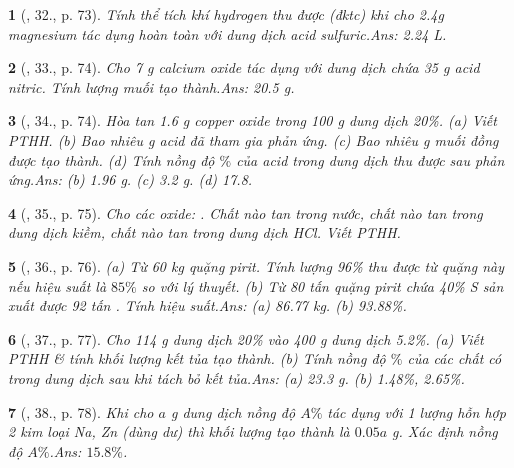 \documentclass{article}
\newtheorem{baitoan}{}
\begin{document}
\begin{baitoan}[\cite{An_Hoa_Hoc_nang_cao_8_9}, 32., p. 73]
	Tính thể tích khí hydrogen thu được (đktc) khi cho {\rm2.4g} magnesium tác dụng hoàn toàn với dung dịch acid sulfuric.\hfill{\sf Ans: 2.24 L.}
\end{baitoan}

\begin{baitoan}[\cite{An_Hoa_Hoc_nang_cao_8_9}, 33., p. 74]
	Cho {\rm7 g} calcium oxide tác dụng với dung dịch chứa {\rm35 g} acid nitric. Tính lượng muối tạo thành.\hfill{\sf Ans: 20.5 g.}
\end{baitoan}

\begin{baitoan}[\cite{An_Hoa_Hoc_nang_cao_8_9}, 34., p. 74]
	Hòa tan {\rm1.6 g} copper oxide trong {\rm100 g} dung dịch {\rm{} 20\%}. (a) Viết {\rm PTHH}. (b) Bao nhiêu {\rm g} acid đã tham gia phản ứng. (c) Bao nhiêu {\rm g} muối đồng được tạo thành. (d) Tính nồng độ $\%$ của acid trong dung dịch thu được sau phản ứng.\hfill{\sf Ans: (b) 1.96 g. (c) 3.2 g. (d) 17.8.}
\end{baitoan}

\begin{baitoan}[\cite{An_Hoa_Hoc_nang_cao_8_9}, 35., p. 75]
	Cho các oxide: {\rm{}}. Chất nào tan trong nước, chất nào tan trong dung dịch kiềm, chất nào tan trong dung dịch {\rm HCl}. Viết {\rm PTHH}.
\end{baitoan}

\begin{baitoan}[\cite{An_Hoa_Hoc_nang_cao_8_9}, 36., p. 76]
	(a) Từ {\rm60 kg} quặng pirit. Tính lượng {\rm{} 96\%} thu được từ quặng này nếu hiệu suất là $85\%$ so với lý thuyết. (b) Từ {\rm80} tấn quặng pirit chứa {\rm40\% S} sản xuất được {\rm92} tấn {\rm{}}. Tính hiệu suất.\hfill{\sf Ans: (a) 86.77 kg. (b) 93.88\%.}
\end{baitoan}

\begin{baitoan}[\cite{An_Hoa_Hoc_nang_cao_8_9}, 37., p. 77]
	Cho {\rm114 g} dung dịch {\rm{} 20\%} vào {\rm400 g} dung dịch {\rm{} 5.2\%}. (a) Viết {\rm PTHH} \& tính khối lượng kết tủa tạo thành. (b) Tính nồng độ $\%$ của các chất có trong dung dịch sau khi tách bỏ kết tủa.\hfill{\sf Ans: (a) 23.3 g. (b) 1.48\%, 2.65\%.}
\end{baitoan}

\begin{baitoan}[\cite{An_Hoa_Hoc_nang_cao_8_9}, 38., p. 78]
	Khi cho $a$ {\rm g} dung dịch {\rm {}} nồng độ $A\%$ tác dụng với 1 lượng hỗn hợp 2 kim loại {\rm Na, Zn} (dùng dư) thì khối lượng {\rm {}} tạo thành là $0.05a$ {\rm g}. Xác định nồng độ $A\%$.\hfill{\sf Ans: $15.8\%$.}
\end{baitoan}
\end{document}
